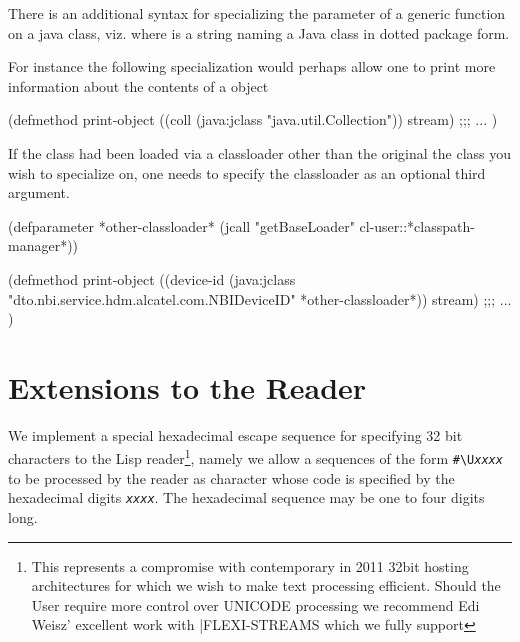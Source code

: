 \documentclass[10pt]{book}
\begin{document}
There is an additional syntax for specializing the parameter of a
generic function on a java class, viz.  where  is a string naming a Java
class in dotted package form.

For instance the following specialization would perhaps allow one to
print more information about the contents of a 
object

\begin{listing-lisp}
(defmethod print-object ((coll (java:jclass "java.util.Collection"))
                         stream)
  ;;; ...
)
\end{listing-lisp}

If the class had been loaded via a classloader other than the original
the class you wish to specialize on, one needs to specify the
classloader as an optional third argument.

\begin{listing-lisp}

(defparameter *other-classloader*
  (jcall "getBaseLoader" cl-user::*classpath-manager*))
  
(defmethod print-object
   ((device-id (java:jclass "dto.nbi.service.hdm.alcatel.com.NBIDeviceID" 
                            *other-classloader*))
    stream)
  ;;; ...
)
\end{listing-lisp}

\section{Extensions to the Reader}

We implement a special hexadecimal escape sequence for specifying 32
bit characters to the Lisp reader\footnote{This represents a
  compromise with contemporary in 2011 32bit hosting architectures for
  which we wish to make text processing efficient.  Should the User
  require more control over \textsc{UNICODE} processing we recommend Edi Weisz'
  excellent work with \textsc|{FLEXI-STREAMS}  which we fully support}, namely we
allow a sequences of the form \verb~#\U~\emph{\texttt{xxxx}} to be processed
by the reader as character whose code is specified by the hexadecimal
digits \emph{\texttt{xxxx}}.  The hexadecimal sequence may be one to four digits
long.

\end{document}

